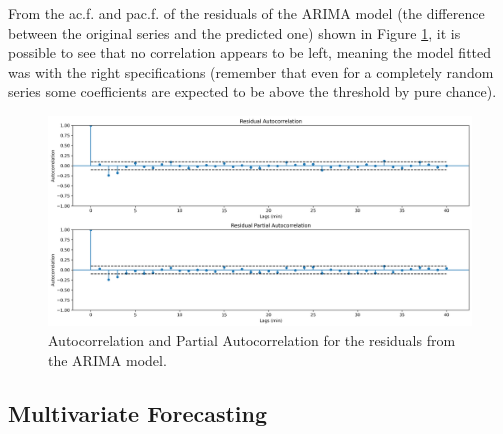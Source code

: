 \documentclass[../main.tex]{subfiles}
\begin{document}
        From the ac.f. and pac.f. of the residuals of the ARIMA model (the difference between the original series and the predicted one) shown in Figure \ref{fig:res_arima}, it is possible to see that no correlation appears to be left, meaning the model fitted was with the right specifications (remember that even for a completely random series some coefficients are expected to be above the threshold by pure chance).

        \begin{figure}[h]
            \begin{center}
            \centering
            \includegraphics[width={\columnwidth}]{images/res_ARIMA.png}
            \caption{Autocorrelation and Partial Autocorrelation for the residuals from the ARIMA model.}
            \label{fig:res_arima}
            \end{center}
        \end{figure}

    \subsection{Multivariate Forecasting}
\end{document}
